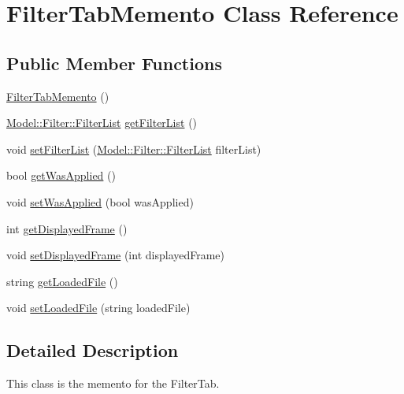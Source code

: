 \hypertarget{classMemento_1_1FilterTabMemento}{}\section{Filter\+Tab\+Memento Class Reference}
\label{classMemento_1_1FilterTabMemento}
\subsection*{Public Member Functions}
\begin{DoxyCompactItemize}
\item 
\hyperlink{classMemento_1_1FilterTabMemento_a84a5fcbb2f69b5b3c57dae3540fdd40b}{Filter\+Tab\+Memento} ()
\item 
\hyperlink{classModel_1_1Filter_1_1FilterList}{Model\+::\+Filter\+::\+Filter\+List} \hyperlink{classMemento_1_1FilterTabMemento_a8f68d1381e85b679f08fb6208565af24}{get\+Filter\+List} ()
\item 
void \hyperlink{classMemento_1_1FilterTabMemento_aa18e770b0715c18549678cb5241b8714}{set\+Filter\+List} (\hyperlink{classModel_1_1Filter_1_1FilterList}{Model\+::\+Filter\+::\+Filter\+List} filter\+List)
\item 
bool \hyperlink{classMemento_1_1FilterTabMemento_aece4e0d122e3afae0c4173edba6a4cc8}{get\+Was\+Applied} ()
\item 
void \hyperlink{classMemento_1_1FilterTabMemento_a635ac39ad3547885c6d8a5f631a86aeb}{set\+Was\+Applied} (bool was\+Applied)
\item 
int \hyperlink{classMemento_1_1FilterTabMemento_a116429d102ca02253915c78f76d305d2}{get\+Displayed\+Frame} ()
\item 
void \hyperlink{classMemento_1_1FilterTabMemento_ad3eeeb568c249bd940edc513b0697cd8}{set\+Displayed\+Frame} (int displayed\+Frame)
\item 
string \hyperlink{classMemento_1_1FilterTabMemento_aef6a8daef5ed9e5ac0862ef4323f3f8d}{get\+Loaded\+File} ()
\item 
void \hyperlink{classMemento_1_1FilterTabMemento_a2dc9fb31a997a0f4d76aa4b6d11c12c9}{set\+Loaded\+File} (string loaded\+File)
\end{DoxyCompactItemize}


\subsection{Detailed Description}
This class is the memento for the Filter\+Tab. 

